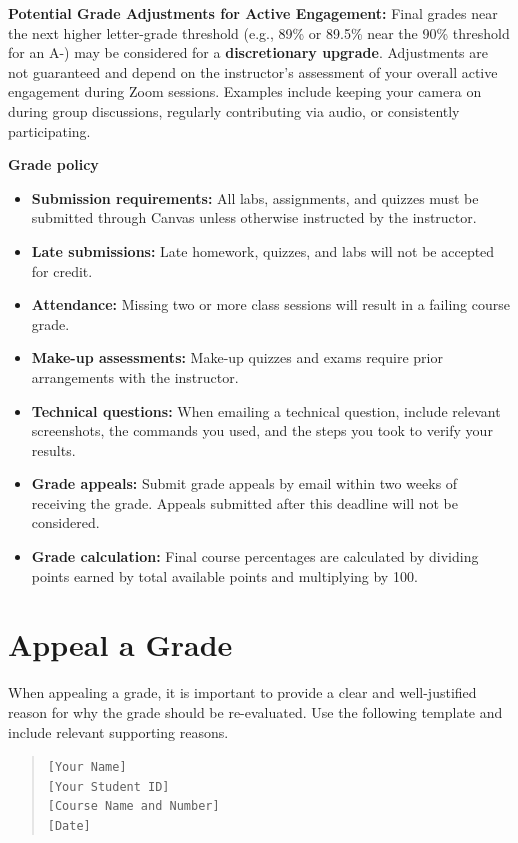 \documentclass[10pt]{article}
\begin{document}
\textbf{Potential Grade Adjustments for Active Engagement:} Final grades near the next higher letter-grade threshold (e.g., 89\% or 89.5\% near the 90\% threshold for an A-) may be considered for a \textbf{discretionary upgrade}. Adjustments are not guaranteed and depend on the instructor's assessment of your overall active engagement during Zoom sessions. Examples include keeping your camera on during group discussions, regularly contributing via audio, or consistently participating.

\begin{policybox}
  \textbf{Grade policy}
  \begin{itemize}
    \item \textbf{Submission requirements:} All labs, assignments, and quizzes must be submitted through Canvas unless otherwise instructed by the instructor.
    \item \textbf{Late submissions:} Late homework, quizzes, and labs will not be accepted for credit.
    \item \textbf{Attendance:} Missing two or more class sessions will result in a failing course grade.
    \item \textbf{Make-up assessments:} Make-up quizzes and exams require prior arrangements with the instructor.
    \item \textbf{Technical questions:} When emailing a technical question, include relevant screenshots, the commands you used, and the steps you took to verify your results.
    \item \textbf{Grade appeals:} Submit grade appeals by email within two weeks of receiving the grade. Appeals submitted after this deadline will not be considered.
    \item \textbf{Grade calculation:} Final course percentages are calculated by dividing points earned by total available points and multiplying by 100.
  \end{itemize}
\end{policybox}

\section{Appeal a Grade}
When appealing a grade, it is important to provide a clear and well-justified reason for why the grade should be re-evaluated. Use the following template and include relevant supporting reasons.

\begin{quote}
  \texttt{[Your Name]}\\
  \texttt{[Your Student ID]}\\
  \texttt{[Course Name and Number]}\\
  \texttt{[Date]}
\end{quote}
\end{document}

